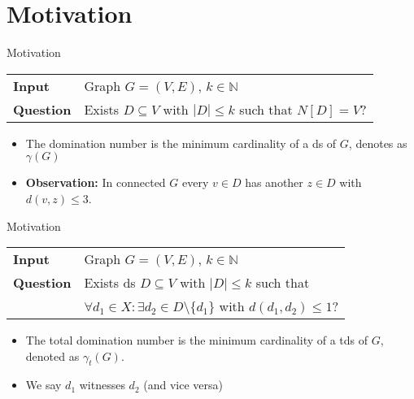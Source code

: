 \section{Motivation}
\begin{frame}[c]{Motivation}
\begin{tcolorbox}[colback=TUMBlueLighter,title=\dom]
    \begin{tabularx}{1.0\textwidth}{>{\hsize=0.30\hsize}X>{\hsize=0.8\hsize}X}
        \textbf{Input} & Graph $G = (V, E)$, $k \in \mathbb{N}$\\
        \textbf{Question} & Exists {$D \subseteq V$} with $|D| \leq k$ such that ${N[D] = V}$? \\
    \end{tabularx}
\end{tcolorbox}

\begin{itemize}
\pause \item The domination number is the minimum cardinality of a ds of $G$, denotes as $\gamma(G)$
\pause \item \textbf{Observation:} In connected $G$ every $v\in D$ has another $z \in D$ with $d(v,z) \leq 3$.
\end{itemize}

\end{frame}

\begin{frame}[c]{Motivation}
\begin{tcolorbox}[colback=TUMBlueLighter,title=\tdom]
    \begin{tabularx}{1.0\textwidth}{>{\hsize=0.30\hsize}X>{\hsize=0.8\hsize}X}
        \textbf{Input} & Graph $G = (V, E)$, $k \in \mathbb{N}$\\
        \textbf{Question} & Exists ds $D \subseteq V$ with $|D| \leq k$ such that \\ 
       &  $\forall d_1 \in X :\exists d_2 \in D \setminus \{d_1\}$ with ${d(d_1, d_2) \leq 1}$? \\
    \end{tabularx}
\end{tcolorbox}

\begin{itemize}
 \pause \item The total domination number is the minimum cardinality of a tds of $G$, denoted as $\gamma_t(G)$.
 \pause \item We say $d_1$ witnesses $d_2$ (and vice versa)
\end{itemize}

\end{frame}

